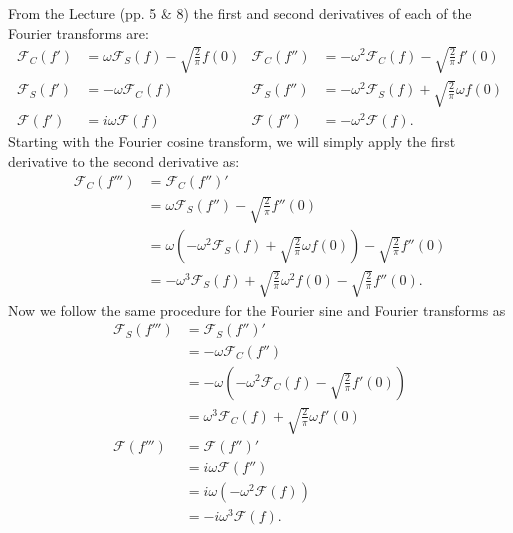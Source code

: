 \begin{derivation}
  From the Lecture (pp. 5 \& 8) the first and second derivatives of each of the Fourier transforms are:
  \begin{align*}
    \mathcal{F}_C (f') &= \omega \mathcal{F}_S (f) - \sqrt{\frac{2}{\pi}}f(0) & \mathcal{F}_C(f'') &= - \omega^2 \mathcal{F}_C(f) - \sqrt{\frac{2}{\pi}} f'(0) \\
    \mathcal{F}_S(f') &= -\omega \mathcal{F}_C (f) & \mathcal{F}_S(f'') &= - \omega^2 \mathcal{F}_S(f) + \sqrt{\frac{2}{\pi}} \omega f(0) \\
    \mathcal{F} (f') &= i \omega \mathcal{F}(f) & \mathcal{F}(f'') &= - \omega^2 \mathcal{F}(f)
  .\end{align*}
  Starting with the Fourier cosine transform, we will simply apply the first derivative to the second derivative as:
  \begin{align*}
    \mathcal{F}_C (f''') &= \mathcal{F}_C(f'')' \\
    &= \omega \mathcal{F}_S (f'') - \sqrt{\frac{2}{\pi}}f''(0) \\
    &= \omega \left( - \omega^2 \mathcal{F}_S(f) + \sqrt{\frac{2}{\pi}} \omega f(0) \right) - \sqrt{\frac{2}{\pi}} f''(0) \\
    &= - \omega^3 \mathcal{F}_S(f) + \sqrt{\frac{2}{\pi}}\omega^2 f(0) - \sqrt{\frac{2}{\pi}}f''(0)
  .\end{align*}
  Now we follow the same procedure for the Fourier sine and Fourier transforms as
  \begin{align*}
    \mathcal{F}_S (f''') &= \mathcal{F}_S (f'')' \\
    &= - \omega \mathcal{F}_C(f'') \\
    &= - \omega \left( - \omega^2 \mathcal{F}_C(f) - \sqrt{\frac{2}{\pi}}f'(0) \right) \\
    &= \omega^3 \mathcal{F}_C (f) + \sqrt{\frac{2}{\pi}} \omega f'(0) \\
    \mathcal{F}(f''') &= \mathcal{F}(f'')' \\
    &= i \omega \mathcal{F}(f'') \\
    &= i \omega \left( - \omega^2 \mathcal{F}(f) \right) \\
    &= - i\omega^3 \mathcal{F}(f)
  .\end{align*}
\end{derivation}


